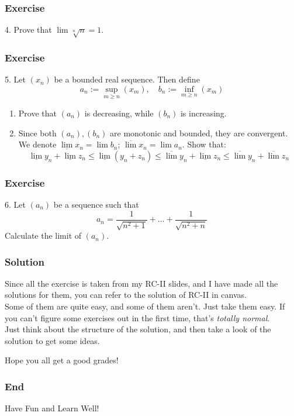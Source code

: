 \documentclass[12pt, t]{beamer}
\renewcommand{\emph}[1]{{\color{Turquoise3}\textsl{#1}}}
\begin{document}
\begin{frame}
    \frametitle{Exercise}
    4. Prove that $\lim \sqrt[n]{n}=1$.
\end{frame}

\begin{frame}
    \frametitle{Exercise}
    5. Let $(x_n)$ be a bounded real sequence. Then define
    \begin{equation*}
        a_n:=\sup_{m\geq n}(x_m),\quad b_n:=\inf_{m\geq n}(x_m)
    \end{equation*}

    \begin{enumerate}
        \item Prove that $(a_n)$ is decreasing, while $(b_n)$ is increasing.
        \item Since both $(a_n),(b_n)$ are monotonic and bounded, they are convergent.
              We denote $\underline{\lim} x_n=\lim b_n$; $\overline{\lim}x_n=\lim a_n$. Show that:
              \begin{equation*}
                  \underline{\lim}y_n+\underline{\lim}z_n\leq \underline{\lim} (y_n+z_n)\leq\overline{\lim}y_n+\underline{\lim}z_n\leq\overline{\lim}y_n+\overline{\lim}z_n
              \end{equation*}
    \end{enumerate}
\end{frame}

\begin{frame}
    \frametitle{Exercise}
    6. Let $(a_n)$ be a sequence such that
    \begin{equation*}
        a_n=\frac{1}{\sqrt{n^2+1}}+\dots+\frac{1}{\sqrt{n^2+n}}
    \end{equation*}
    Calculate the limit of $(a_n)$.
\end{frame}

\begin{frame}
    \frametitle{Solution}

    Since all the exercise is taken from my RC-II slides, and I have made all the solutions for them, you can refer to the solution of RC-II in canvas.\\
    \vspace{1em}
    Some of them are quite easy, and some of them aren't. Just take them easy. If you can't figure some exercises out in the first time, that's \emph{totally normal}.\\
    \vspace{1em}
    Just think about the structure of the solution, and then take a look of the solution to get some ideas.\\
    \vspace{1.5em}
    \begin{center}
        Hope you all get a good grades!
    \end{center}

\end{frame}

\begin{frame}
    \frametitle{End}
    \vspace{2cm}
    \Huge \center  Have Fun and Learn Well!
\end{frame}
\end{document}
